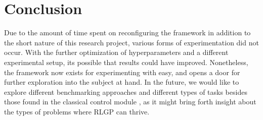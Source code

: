 \documentclass[12pt, final]{dalcsthesis}
\begin{document}
\chapter{Conclusion}

Due to the amount of time spent on reconfiguring the framework in addition to the short nature of this research project,
various forms of experimentation did not occur. With the further optimization of hyperparameters and a different experimental setup, its possible that results could have improved. Nonetheless, the framework now exists for experimenting with easy, and opens a door for further exploration into the subject at hand. In the future, we would like to
explore different benchmarking approaches and different types of tasks besides those found in the classical control module \cite{1606.01540}, as it might bring forth insight about the types of problems where RLGP can thrive.



\end{document}
